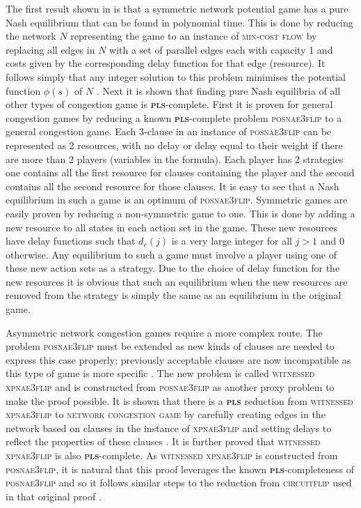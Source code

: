 \documentclass{article}
\begin{document}
\par
The first result shown in \cite{Fabrikant.2004} is that a symmetric network potential game has a pure Nash equilibrium that can be found in polynomial time. This is done by reducing the network $N$ representing the game to an instance of \textsc{min-cost flow} by replacing all edges in $N$ with a set of parallel edges each with capacity 1 and costs given by the corresponding delay function for that edge (resource). It follows simply that any integer solution to this problem minimises the potential function $\phi(s)$ of $N$ \cite{Fabrikant.2004}. Next it is shown that finding pure Nash equilibria of all other types of congestion game is \textbf{\textsc{pls}}-complete. First it is proven for general congestion games by reducing a known \textbf{\textsc{pls}}-complete problem \textsc{posnae3flip} \cite{local_search_complex} to a general congestion game. Each 3-clause in an instance of \textsc{posnae3flip} can be represented as 2 resources, with no delay or delay equal to their weight if there are more than 2 players (variables in the formula). Each player has 2 strategies one contains all the first resource for clauses containing the player and the second contains all the second resource for those clauses. It is easy to see that a Nash equilibrium in such a game is an optimum of \textsc{posnae3flip}. Symmetric games are easily proven by reducing a non-symmetric game to one. This is done by adding a new resource to all states in each action set in the game. These new resources have delay functions such that $d_e(j)$ is a very large integer for all $j>1$ and $0$ otherwise. Any equilibrium to such a game must involve a player using one of these new action sets as a strategy. Due to the choice of delay function for the new resources it is obvious that such an equilibrium when the new resources are removed from the strategy is simply the same as an equilibrium in the original game.

Asymmetric network congestion games require a more complex route. The problem \textsc{posnae3flip} must be extended as new kinds of clauses are needed to express this case properly; previously acceptable clauses are now incompatible as this type of game is more specific \cite{Fabrikant.2004}. The new problem is called \textsc{witnessed xpnae3flip} and is constructed from \textsc{posnae3flip} as another proxy problem to make the proof possible. It is shown that there is a \textbf{\textsc{pls}} reduction from \textsc{witnessed xpnae3flip} to \textsc{network congestion game} by carefully creating edges in the network based on clauses in the instance of \textsc{xpnae3flip} and setting delays to reflect the properties of these clauses \cite{Fabrikant.2004}. It is further proved that \textsc{witnessed xpnae3flip} is also \textbf{\textsc{pls}}-complete. As \textsc{witnessed xpnae3flip} is constructed from \textsc{posnae3flip}, it is natural that this proof leverages the known \textbf{\textsc{pls}}-completeness of \textsc{posnae3flip} and so it follows similar steps to the reduction from \textsc{circuitflip} used in that original proof \cite{local_search_complex}.
\end{document}
